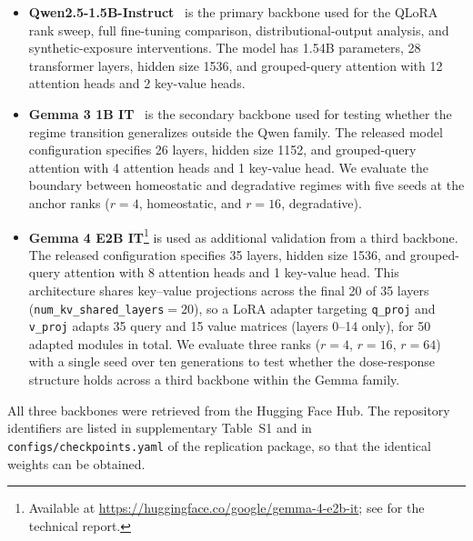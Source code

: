\documentclass[a4paper,fleqn]{cas-dc}
\newif\ifshowchanges
\newcommand{\rev}[1]{\ifshowchanges{\color{blue}#1}\else{#1}\fi}
\begin{document}
\begin{itemize}
    \item \textbf{Qwen2.5-1.5B-Instruct}~\citep{qwen2024} is the primary
    backbone used for the QLoRA rank sweep, full fine-tuning comparison,
    distributional-output analysis, and synthetic-exposure interventions. The
    model has 1.54B parameters, 28 transformer layers, hidden size 1536, and
    grouped-query attention with 12 attention heads and 2 key-value heads.

    \item \textbf{Gemma 3 1B IT}~\citep{gemma2025} is the secondary backbone
    used for testing whether the regime transition generalizes outside the Qwen
    family. The released model configuration specifies 26 layers, hidden size
    1152, and grouped-query attention with 4 attention heads and 1 key-value
    head. We evaluate the boundary between homeostatic and degradative regimes
    with five seeds at the anchor ranks ($r=4$, homeostatic, and $r=16$, degradative).

    \item \textbf{Gemma 4 E2B IT}\footnote{Available at
    \url{https://huggingface.co/google/gemma-4-e2b-it};
    \rev{see \citet{gemma4_2026} for the technical report.}} is used as additional
    \rev{validation from a third backbone}. The released configuration specifies
    35 layers, hidden size 1536, and grouped-query attention with 8 attention
    heads and 1 key-value head. This architecture shares key--value projections
    across the final 20 of 35 layers (\texttt{num\_kv\_shared\_layers}$=20$),
    so a LoRA adapter targeting \texttt{q\_proj} and \texttt{v\_proj} adapts
    35 query and 15 value matrices (layers 0--14 only), for 50 adapted
    modules in total. We evaluate three ranks ($r=4$,
    $r=16$, $r=64$) with a single seed over ten generations to test whether
    the dose-response structure \rev{holds across a third backbone within the Gemma
    family}.
\end{itemize}


\rev{All three backbones were retrieved from the Hugging Face Hub.
The repository identifiers are listed
in supplementary Table~S1 and in \texttt{configs/checkpoints.yaml} of
the replication package, so that the identical weights can be
obtained.}
\end{document}
